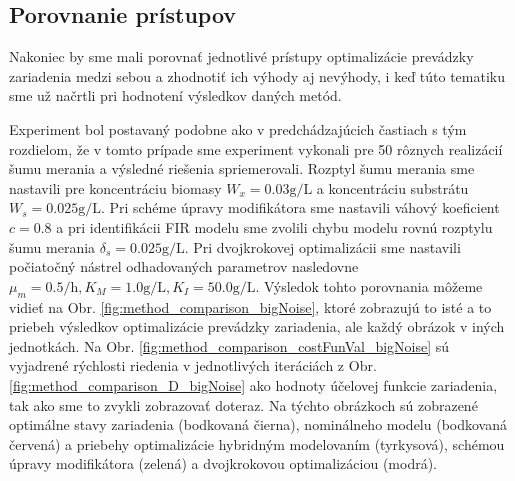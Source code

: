 \subsection{Porovnanie prístupov}
Nakoniec by sme mali porovnať jednotlivé prístupy optimalizácie prevádzky zariadenia medzi sebou a zhodnotiť ich výhody aj nevýhody, i keď túto tematiku sme už načrtli pri hodnotení výsledkov daných metód.

Experiment bol postavaný podobne ako v predchádzajúcich častiach s tým rozdielom, že v tomto prípade sme experiment vykonali pre 50 rôznych realizácií šumu merania a výsledné riešenia spriemerovali. Rozptyl šumu merania sme nastavili pre koncentráciu biomasy $ W_{x} = 0.03\si{\gram\per\liter} $ a koncentráciu substrátu $ W_{s} = 0.025\si{\gram\per\liter} $. Pri schéme úpravy modifikátora sme nastavili váhový koeficient $ c = 0.8 $ a pri identifikácii FIR modelu sme zvolili chybu modelu rovnú rozptylu šumu merania $ \delta_{s} = 0.025\si{\gram\per\liter} $. Pri dvojkrokovej optimalizácii sme nastavili počiatočný nástrel odhadovaných parametrov nasledovne $ \mu_{m} = 0.5\si{\per\hour}, K_{M} = 1.0\si{\gram\per\liter}, K_{I} = 50.0\si{\gram\per\liter} $. Výsledok tohto porovnania môžeme vidieť na Obr. \ref{fig:method_comparison_bigNoise}, ktoré zobrazujú to isté a to priebeh výsledkov optimalizácie prevádzky zariadenia, ale každý obrázok v iných jednotkách. Na Obr. \ref{fig:method_comparison_costFunVal_bigNoise} sú vyjadrené rýchlosti riedenia v jednotlivých iteráciách z Obr. \ref{fig:method_comparison_D_bigNoise} ako hodnoty účelovej funkcie zariadenia, tak ako sme to zvykli zobrazovať doteraz. Na týchto obrázkoch sú zobrazené optimálne stavy zariadenia (bodkovaná čierna), nominálneho modelu (bodkovaná červená) a priebehy optimalizácie hybridným modelovaním (tyrkysová), schémou úpravy modifikátora (zelená) a dvojkrokovou optimalizáciou (modrá).
